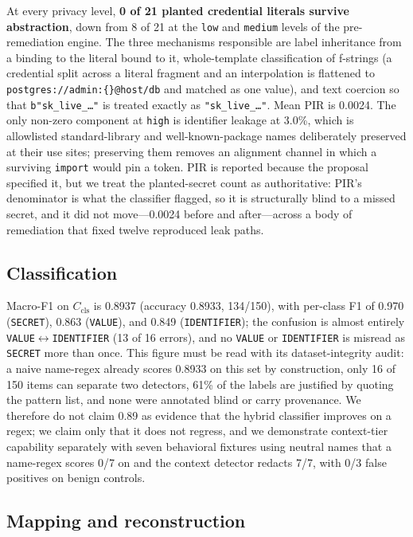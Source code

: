 \documentclass[conference]{IEEEtran}
\begin{document}
At every privacy level, \textbf{0 of 21 planted credential literals
survive abstraction}, down from 8 of 21 at the \texttt{low} and
\texttt{medium} levels of the pre-remediation engine. The three
mechanisms responsible are label inheritance from a binding to the literal
bound to it, whole-template classification of f-strings (a credential
split across a literal fragment and an interpolation is flattened to
\texttt{postgres://admin:\{\}@host/db} and matched as one value), and
text coercion so that \texttt{b"sk\_live\_\dots"} is treated exactly as
\texttt{"sk\_live\_\dots"}. Mean PIR is 0.0024. The only non-zero
component at \texttt{high} is identifier leakage at 3.0\%, which is
allowlisted standard-library and well-known-package names deliberately
preserved at their use sites; preserving them removes an alignment channel
in which a surviving \texttt{import} would pin a token. PIR is reported
because the proposal specified it, but we treat the planted-secret count
as authoritative: PIR's denominator is what the classifier flagged, so it
is structurally blind to a missed secret, and it did not move---0.0024
before and after---across a body of remediation that fixed twelve
reproduced leak paths.

\subsection{Classification}

Macro-F1 on $C_{\text{cls}}$ is 0.8937 (accuracy 0.8933, 134/150), with
per-class F1 of 0.970 (\texttt{SECRET}), 0.863 (\texttt{VALUE}), and 0.849
(\texttt{IDENTIFIER}); the confusion is almost entirely
\texttt{VALUE}$\leftrightarrow$\texttt{IDENTIFIER} (13 of 16 errors), and
no \texttt{VALUE} or \texttt{IDENTIFIER} is misread as \texttt{SECRET}
more than once. This figure must be read with its dataset-integrity audit:
a naive name-regex already scores 0.8933 on this set by construction,
only 16 of 150 items can separate two detectors, 61\% of the labels are
justified by quoting the pattern list, and none were annotated blind or
carry provenance. We therefore do not claim 0.89 as evidence that the
hybrid classifier improves on a regex; we claim only that it does not
regress, and we demonstrate context-tier capability separately with seven
behavioral fixtures using neutral names that a name-regex scores 0/7 on
and the context detector redacts 7/7, with 0/3 false positives on benign
controls.

\subsection{Mapping and reconstruction}
\end{document}
